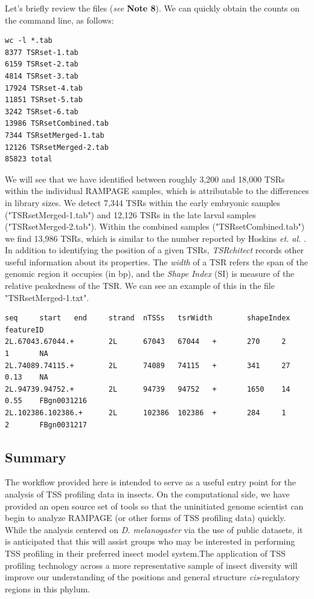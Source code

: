 \documentclass[runningheads,a4paper]{llncs}
\begin{document}
\begin{linenumbers}
\noindent
Let's briefly review the files (\textit{see} \textbf{Note 8}). 
We can quickly obtain the counts on the command line, as follows:

\noindent
\begin{verbatim}
wc -l *.tab
8377 TSRset-1.tab
6159 TSRset-2.tab
4814 TSRset-3.tab
17924 TSRset-4.tab
11851 TSRset-5.tab
3242 TSRset-6.tab
13986 TSRsetCombined.tab
7344 TSRsetMerged-1.tab
12126 TSRsetMerged-2.tab
85823 total
\end{verbatim}

\noindent
We will see that we have identified between roughly 3,200 and 18,000 TSRs within the individual RAMPAGE samples, which is attributable to the differences in library sizes. 
We detect 7,344 TSRs within the early embryonic samples ("TSRsetMerged-1.tab") and 12,126 TSRs in the late larval samples ("TSRsetMerged-2.tab").
Within the combined samples ("TSRsetCombined.tab") we find 13,986 TSRs, which is similar to the number reported by Hoskins \textit{et. al.} \cite{Hoskins:2011io}.\\

\noindent
In addition to identifying the position of a given TSRs, \textit{TSRchitect} records other useful information about its properties.
The \textit{width} of a TSR refers the span of the genomic region it occupies (in bp), and the \textit{Shape Index} (SI) is measure of the relative peakedness of the TSR.
We can see an example of this in the file "TSRsetMerged-1.txt".

\noindent
\begin{verbatim}
seq     start   end     strand  nTSSs   tsrWidth        shapeIndex      featureID
2L.67043.67044.+        2L      67043   67044   +       270     2       1       NA
2L.74089.74115.+        2L      74089   74115   +       341     27      0.13    NA
2L.94739.94752.+        2L      94739   94752   +       1650    14      0.55    FBgn0031216
2L.102386.102386.+      2L      102386  102386  +       284     1       2       FBgn0031217
\end{verbatim}

\subsection{Summary}
The workflow provided here is intended to serve as a useful entry point for the analysis of TSS profiling data in insects. 
On the computational side, we have provided an open source set of tools so that the uninitiated genome scientist can begin to analyze RAMPAGE (or other forms of TSS profiling data) quickly.
While the analysis centered on \textit{D. melanogaster} via the use of public datasets, it is anticipated that this will assist groups who may be interested in performing TSS profiling in their preferred insect model system.The application of TSS profiling technology across a more representative sample of insect diversity will improve our understanding of the positions and general structure \textit{cis}-regulatory regions in this phylum.


\end{linenumbers}
\end{document}
